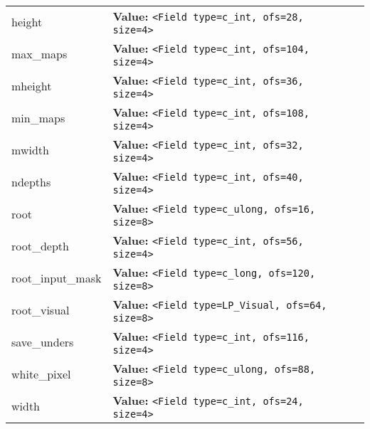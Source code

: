 \begin{longtable}{|p{\varnamewidth}|p{\vardescrwidth}|l}
\cline{1-2}
\raggedright h\-e\-i\-g\-h\-t\- & \raggedright \textbf{Value:} 
{\tt {\textless}Field type=c\_int, ofs=28, size=4{\textgreater}}&\\
\cline{1-2}
\raggedright m\-a\-x\-\_\-m\-a\-p\-s\- & \raggedright \textbf{Value:} 
{\tt {\textless}Field type=c\_int, ofs=104, size=4{\textgreater}}&\\
\cline{1-2}
\raggedright m\-h\-e\-i\-g\-h\-t\- & \raggedright \textbf{Value:} 
{\tt {\textless}Field type=c\_int, ofs=36, size=4{\textgreater}}&\\
\cline{1-2}
\raggedright m\-i\-n\-\_\-m\-a\-p\-s\- & \raggedright \textbf{Value:} 
{\tt {\textless}Field type=c\_int, ofs=108, size=4{\textgreater}}&\\
\cline{1-2}
\raggedright m\-w\-i\-d\-t\-h\- & \raggedright \textbf{Value:} 
{\tt {\textless}Field type=c\_int, ofs=32, size=4{\textgreater}}&\\
\cline{1-2}
\raggedright n\-d\-e\-p\-t\-h\-s\- & \raggedright \textbf{Value:} 
{\tt {\textless}Field type=c\_int, ofs=40, size=4{\textgreater}}&\\
\cline{1-2}
\raggedright r\-o\-o\-t\- & \raggedright \textbf{Value:} 
{\tt {\textless}Field type=c\_ulong, ofs=16, size=8{\textgreater}}&\\
\cline{1-2}
\raggedright r\-o\-o\-t\-\_\-d\-e\-p\-t\-h\- & \raggedright \textbf{Value:} 
{\tt {\textless}Field type=c\_int, ofs=56, size=4{\textgreater}}&\\
\cline{1-2}
\raggedright r\-o\-o\-t\-\_\-i\-n\-p\-u\-t\-\_\-m\-a\-s\-k\- & \raggedright \textbf{Value:} 
{\tt {\textless}Field type=c\_long, ofs=120, size=8{\textgreater}}&\\
\cline{1-2}
\raggedright r\-o\-o\-t\-\_\-v\-i\-s\-u\-a\-l\- & \raggedright \textbf{Value:} 
{\tt {\textless}Field type=LP\_Visual, ofs=64, size=8{\textgreater}}&\\
\cline{1-2}
\raggedright s\-a\-v\-e\-\_\-u\-n\-d\-e\-r\-s\- & \raggedright \textbf{Value:} 
{\tt {\textless}Field type=c\_int, ofs=116, size=4{\textgreater}}&\\
\cline{1-2}
\raggedright w\-h\-i\-t\-e\-\_\-p\-i\-x\-e\-l\- & \raggedright \textbf{Value:} 
{\tt {\textless}Field type=c\_ulong, ofs=88, size=8{\textgreater}}&\\
\cline{1-2}
\raggedright w\-i\-d\-t\-h\- & \raggedright \textbf{Value:} 
{\tt {\textless}Field type=c\_int, ofs=24, size=4{\textgreater}}&\\
\cline{1-2}
\end{longtable}

